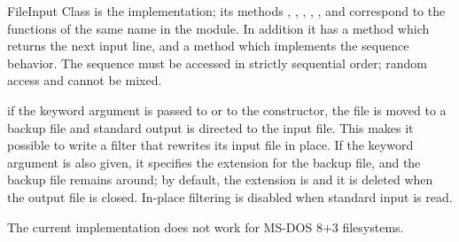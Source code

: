 \begin{classdesc}{FileInput}{}
  Class  is the implementation; its methods
  , , ,
  , ,  and
   correspond to the functions of the same name in the
  module.  In addition it has a  method which
  returns the next input line, and a  method
  which implements the sequence behavior.  The sequence must be
  accessed in strictly sequential order; random access and
   cannot be mixed.
\end{classdesc}

 if the keyword argument
 is passed to  or to the
 constructor, the file is moved to a backup file and
standard output is directed to the input file.
This makes it possible to write a filter that rewrites its input file
in place.  If the keyword argument  is also given, it specifies the extension for the backup
file, and the backup file remains around; by default, the extension is
 and it is deleted when the output file is closed.  In-place
filtering is disabled when standard input is read.

 The current implementation does not work for MS-DOS
8+3 filesystems.
